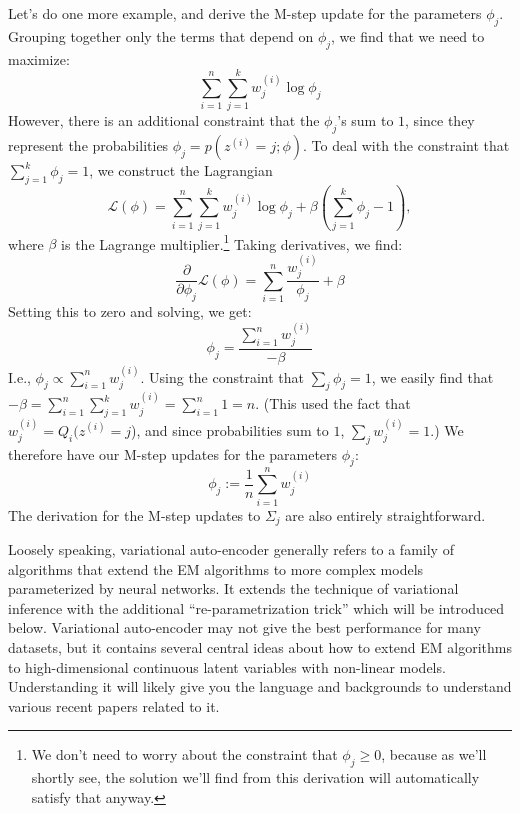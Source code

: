 Let's do one more example, and derive the M-step update for the
parameters $\phi_j$. Grouping together only the terms that depend on $\phi_j$, we find that
we need to maximize:
\begin{equation*}
    \sum_{i=1}^n \sum_{j=1}^k w^{(i)}_j \log\phi_j
\end{equation*}
However, there is an additional constraint that the $\phi_j$'s sum to $1$, since they
represent the probabilities $\phi_j = p(z^{(i)} = j;\phi)$. To deal with the constraint
that $\sum^k_{j=1} \phi_j = 1$, we construct the Lagrangian
\begin{equation*}
    \mathcal L(\phi) = \sum_{i=1}^n \sum_{j=1}^k w^{(i)}_j \log\phi_j + \beta\left(\sum_{j=1}^k \phi_j - 1\right),
\end{equation*}
where $\beta$ is the Lagrange multiplier.\footnote{
We don't need to worry about the constraint that $\phi_j \ge 0$, because as we'll shortly see,
the solution we'll find from this derivation will automatically satisfy that anyway.    
} Taking derivatives, we find:
\begin{equation*}
    \frac{\partial}{\partial\phi_j} \mathcal L(\phi) = \sum_{i=1}^n \frac{w^{(i)}_j}{\phi_j} + \beta
\end{equation*}
Setting this to zero and solving, we get:
\begin{equation*}
    \phi_j = \frac{\sum^n_{i=1} w^{(i)}_j}{-\beta}
\end{equation*}
I.e., $\phi_j \propto \sum^n_{i=1} w^{(i)}_j$. Using the constraint that
$\sum_j \phi_j = 1$, we easily find that $-\beta = \sum^n_{i=1} \sum^k_{j=1} w^{(i)}_j = \sum^n_{i=1} 1 = n$.
(This used the fact that $w^{(i)}_j = Q_i (z^{(i)} = j$), and since probabilities sum to $1$,
$\sum_j w^{(i)}_j = 1$.) We therefore
have our M-step updates for the parameters $\phi_j$:
\begin{equation}
    \phi_j := \frac{1}{n} \sum_{i=1}^n w^{(i)}_j
\end{equation}
The derivation for the M-step updates to $\Sigma_j$ are also entirely
straightforward.

\vspace{1cm}
\begin{fullwidth}
\label{cha:variational}
\end{fullwidth}
Loosely speaking, variational auto-encoder\cite{kingma2013auto} generally refers to a family of
algorithms that extend the EM algorithms to more complex models
parameterized by neural networks. It extends the technique of variational inference
with the additional ``re-parametrization trick'' which will be introduced
below. Variational auto-encoder may not give the best performance for many
datasets, but it contains several central ideas about how to extend EM
algorithms to high-dimensional continuous latent variables with non-linear
models. Understanding it will likely give you the language and backgrounds to
understand various recent papers related to it.

